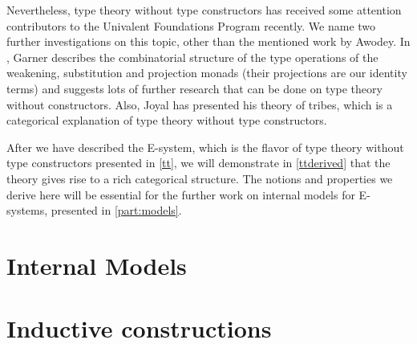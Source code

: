 \documentclass{article}
\begin{document}
Nevertheless, type theory without type constructors has received some attention
contributors to the Univalent Foundations Program recently. We name two
further investigations on this topic, other than the mentioned work by Awodey.
In \cite{Garner2014}, Garner describes the combinatorial structure
of the type operations of the weakening, substitution and projection monads
(their projections are our identity terms) and suggests lots of further research
that can be done on type theory without constructors. Also, Joyal has presented
his theory of tribes, which is a categorical explanation of type theory
without type constructors.

After we have described the E-system, which is the flavor of type theory without
type constructors presented in \autoref{tt}, we will demonstrate in \autoref{ttderived}
that the theory gives rise to a rich categorical structure. The notions and
properties we derive here will be essential for the further work on internal
models for E-systems, presented in \autoref{part:models}.








\part{Internal Models}\label{part:models}









\part{Inductive constructions}





%

%

%



\end{document}
